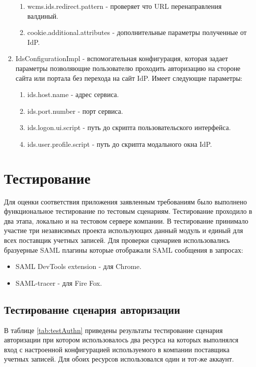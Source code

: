 \begin{enumerate}
\begin{enumerate}
\item wcms.ids.redirect.pattern - проверяет что URL перенаправления валдиный. 
\item cookie.additional.attributes - дополнительные параметры полученные от IdP.
\end{enumerate}
\item IdsConfigurationImpl - вспомогательная конфигурация, которая задает параметры позволяющие пользователю проходить авторизацию на стороне сайта или портала без перехода на сайт IdP. Имеет следующие параметры:
\begin{enumerate}
\item ids.host.name - адрес сервиса.
\item ids.port.number - порт сервиса.
\item ids.logon.ui.script - путь до скрипта пользовательского интерфейса.
\item ids.user.profile.script - путь до скрипта модального окна IdP.
\end{enumerate}
\end{enumerate}

\section{Тестирование}

Для оценки соответствия приложения заявленным требованиям было выполнено функциональное тестирование по тестовым сценариям. Тестирование проходило в два этапа, локально и на тестовом сервере компании. В тестирование принимало участие три независимых проекта использующих данный модуль и единый для всех поставщик учетных записей. Для проверки сценариев использовались бразуерные SAML плагины которые отображали SAML сообщения в запросах:

\begin{itemize}
\item SAML DevTools extension - для Chrome.
\item SAML-tracer - для Fire Fox.
\end{itemize}

\subsection{Тестирование сценария авторизации}
В таблице \ref{tab:testAuthn} приведены результаты тестирование сценария авторизации при котором использовалось два ресурса на которых выполнялся вход с настроенной конфигурацией используемого в компании поставщика учетных записей. Для обоих ресурсов использовался один и тот-же аккаунт.

